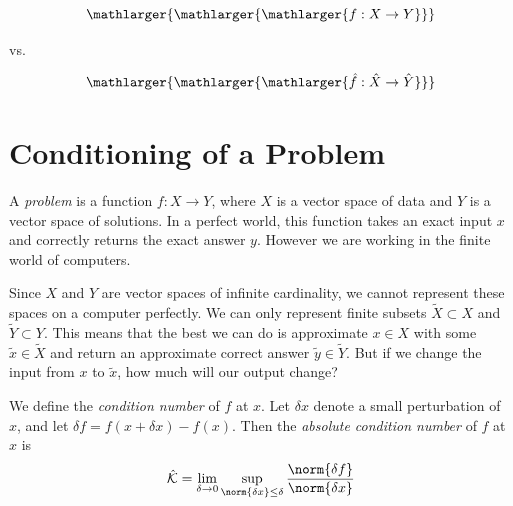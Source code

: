\label{lab:conditioning_stability}


\begin{equation*}
\mathlarger{ \mathlarger{ \mathlarger{f:X \rightarrow Y}}}
\end{equation*}
\begin{center} vs. \end{center}
\begin{equation*}
\mathlarger{ \mathlarger{ \mathlarger{\hat{f}:\hat{X} \rightarrow \hat{Y}}}}
\end{equation*}

% 

\section*{Conditioning of a Problem}


A \emph{problem} is a function $f:X \rightarrow Y$, where $X$ is a vector space of data and $Y$ is a vector space of solutions. In a perfect world, this function takes an exact input $x$ and correctly returns the exact answer $y$. However we are working in the finite world of computers.

Since $X$ and $Y$ are vector spaces of infinite cardinality, we cannot represent these spaces on a computer perfectly. We can only represent finite subsets $\tilde{X} \subset X$ and $\tilde{Y} \subset Y$. This means that the best we can do is approximate $x \in X$ with some $\tilde{x} \in \tilde{X}$ and return an approximate correct answer $\tilde{y} \in \tilde{Y}$. But if we change the input from $x$ to $\tilde{x}$, how much will our output change?

We define the \emph{condition number} of $f$ at $x$. Let $\delta x$ denote a small perturbation of $x$, and let $\delta f = f(x+\delta x) - f(x)$. Then the \emph{absolute condition number} of $f$ at $x$ is 
 \[
\hat{\mathcal{K}} = \lim_{\delta \rightarrow 0} \sup_{\norm{\delta x} \leq \delta} { \frac{\norm{\delta f}}{\norm{\delta x}} } 
\]

